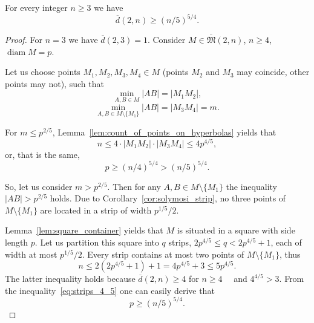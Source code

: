 \documentclass[11pt,twoside,draft
]{article}
\renewcommand*{\&}{\textbackslash \symbol{38}}%
\begin{document}
\begin{Theorem}
	\label{thm:main_result}
	For every integer $n \geq 3$ we have
	\begin{equation}
		\overline{d}(2,n) \geq (n/5)^{5/4}
		.
	\end{equation}
\end{Theorem}

\begin{proof}
	For $n = 3$ we have $\overline{d}(2,3) = 1$.
	Consider $M\in\overline{\mathfrak{M}}(2,n)$, $n \geq 4$, $\operatorname{diam} M = p$.

	Let us choose points $M_1, M_2, M_3, M_4 \in M$
	(points $M_2$ and $M_3$ may coincide, other points may not), such that
	\begin{equation}
		\min_{A, B \in M} |AB| = |M_1 M_2|
		,
	\end{equation}
	\begin{equation}
		\min_{A, B \in M \setminus \{M_1\}} |AB| = |M_3 M_4| = m
		.
	\end{equation}

	For $m \leq p^{2/5}$, Lemma~\ref{lem:count_of_points_on_hyperbolas} yields that
	\begin{equation}
		n \leq 4 \cdot |M_1 M_2| \cdot |M_3 M_4| \leq  4 p^{4/5}
		,
	\end{equation}
	or, that is the same,
	\begin{equation}
		\label{eq:hyperbolas_5_4}
		p \geq (n/4) ^ {5/4} > (n/5) ^ {5/4}
		.
	\end{equation}

	So, let us consider $m > p^{2/5}$.
	Then for any $A,B \in M\setminus\{M_1\}$ the inequality $|AB| > p^{2/5}$ holds.
	Due to Corollary~\ref{cor:solymosi_strip}, no three points of $M\setminus\{M_1\}$
	are located in a strip of width $p^{1/5} / 2$.



	Lemma~\ref{lem:square_container} yields that $M$ is situated in a square with side length $p$.
	Let us partition this square into $q$ strips, $2p^{4/5} \leq q < 2p^{4/5} + 1$, each of width at most $p^{1/5} / 2$.
	Every strip contains at most two points of  $M\setminus\{M_1\}$,
	thus
	\begin{equation}
		\label{eq:strips_4_5}
		n \leq 2(2p^{4/5} + 1) + 1
		= 4p^{4/5}+3
		\leq 5 p^{4/5}
		.
	\end{equation}
	The latter inequality holds because $\overline{d}(2,n) \geq 4$ for $n\geq 4$~~\cite{kurz2008minimum}
	and $4^{4/5}>3$.
	From the inequality~\eqref{eq:strips_4_5} one can easily derive that
	\begin{equation}
		\label{eq:strips_5_4}
		p \geq (n/5) ^ {5/4}
		.
	\end{equation}
\end{proof}
\end{document}
